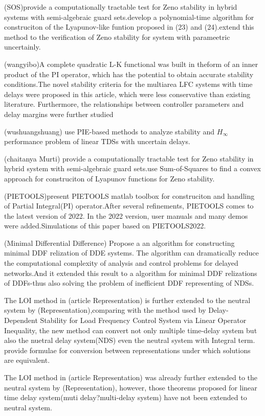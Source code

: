 \documentclass[twocolumn]{autart}    %
\begin{document}
(SOS)provide a computationally tractable test for Zeno stability in hybrid systems with semi-algebraic 
guard sets.develop a polynomial-time algorithm for construciton of the Lyapunov-like funtion proposed
in (23) and (24).extend this method to the verification of Zeno stability for system with parameetric 
uncertainly.

(wangyibo)A complete quadratic L-K functional was built in theform of an inner product of the PI operator, which has 
the potential to obtain accurate stability conditions.The novel stability criteria for the multiarea LFC 
systems with time delays were proposed in this article, which were less conservative than existing literature. Furthermore, the relationships between controller 
parameters and delay margins were further studied

(wushuangshuang) use PIE-based methods to analyze stability and $H_{\infty}$ performance problem of linear 
TDSs with uncertain delays.

(chaitanya Murti) provide  a computationally tractable test for Zeno stability in hybrid system with semi-algebraic 
guard sets.use Sum-of-Squares to find a convex approach for construciton of Lyapunov functions for Zeno stability.

(PIETOOLS)present PIETOOLS matlab toolbox for construciton and handling of Partial Integral(PI) operator.After several refinements, PIETOOLS comes to the latest version of 2022.
In the 2022 version, user manuals and many demos were added.Simulations of this paper based on PIETOOLS2022. 

(Minimal Differential Difference)
Propose a an algorithm for constructing minimal DDF relization of DDE systems. The algorithm can dramatically reduce the computational 
complexity of analysis and control problems for delayed networks.And it extended this result to a algorithm for minimal DDF relizations
of DDFs-thus also solving the problem of inefficient DDF representing of NDSs.

The LOI method in (article Representation) is further extended to the neutral system by (Representation),comparing with the method used by Delay-Dependent Stability for 
Load Frequency Control System via Linear Operator Inequality, the new method can 
convert not only multiple time-delay system but also the nuetral delay system(NDS) 
even the neutral system with Integral term.
provide formulae for conversion between representations under which solutions are equivalent.

The LOI method in (article Representation) was already further extended to the neutral system by (Representation),
however, those theorems proposed for linear time delay system(muti delay?multi-delay system) have not been extended to neutral system.
\end{document}
